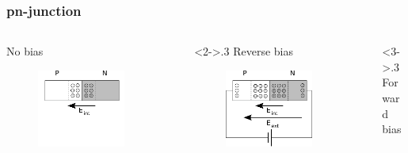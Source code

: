 \documentclass[beamer]{standalone}
\begin{document}
\frame
{ \frametitle{pn-junction} %
\begin{columns}[t]
  \begin{column}{.3\textwidth}
    No bias
    \begin{figure}
      \includegraphics[width=0.80\textwidth]{./pics/pnjunction_nobias}
    \end{figure}
  \end{column}
  \begin{column}<2->{.3\textwidth}
    Reverse bias
    \begin{figure}
      \includegraphics[width=0.80\textwidth]{./pics/pnjunction_reverse_bias}
    \end{figure}
  \end{column}
  \begin{column}<3->{.3\textwidth}
    Forward bias

\end{column}
\end{columns}}
\end{document}
